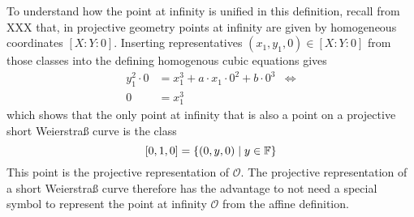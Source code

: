 To understand how the point at infinity is unified in this definition, recall from XXX that, in projective geometry points at infinity are given by homogeneous coordinates $[X:Y:0]$. Inserting representatives $(x_1,y_1,0)\in [X:Y:0]$ from those classes into the defining homogenous cubic equations gives
\begin{align*}
y_1^2\cdot 0 & = x_1^3+a\cdot x_1\cdot 0^2 + b\cdot 0^3 & \Leftrightarrow \\
0 & = x_1^3
\end{align*}
which shows that the only point at infinity that is also a point on a projective short Weierstraß curve is the class
$$
[0,1,0] = \{(0,y,0)\;|\; y\in \mathbb{F}\}
$$
This point is the projective representation of $\mathcal{O}$. The projective representation of a short Weierstraß curve therefore has the advantage to not need a special symbol to represent the point at infinity $\mathcal{O}$ from the affine definition.
